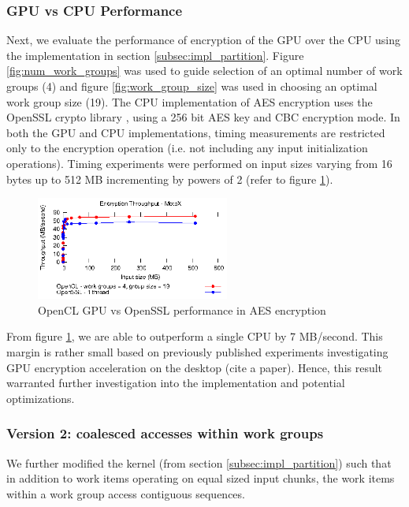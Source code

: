 \documentclass[conference,10pt]{IEEEtran}
\begin{document}
\subsubsection{GPU vs CPU Performance}
\label{subsec:gpu_vs_cpu}

Next, we evaluate the performance of encryption of the GPU over the CPU using the implementation in 
section \ref{subsec:impl_partition}.   Figure \ref{fig:num_work_groups} was used to guide selection 
of an optimal number of work groups (4) and figure \ref{fig:work_group_size} was used in choosing an 
optimal work group size (19).  The CPU implementation of AES encryption uses the OpenSSL crypto 
library \cite{openssl}, using a 256 bit AES key and CBC encryption mode.  In both the GPU and CPU 
implementations, timing measurements are restricted only to the encryption operation (i.e. not 
including any input initialization operations).  Timing experiments were performed on input sizes 
varying from 16 bytes up to 512 MB incrementing by powers of 2 (refer to figure 
\ref{fig:opencl_vs_cpu}).

\begin{figure}[!t]
\centering
\includegraphics[width=2.5in]{../final/motox/4.2/opencl_sizes_vs_cpu_sizes.opencl_4G_19L.cpu_1thread.report.eps}
\caption{OpenCL GPU vs OpenSSL performance in AES encryption}
\label{fig:opencl_vs_cpu}
\end{figure}

From figure \ref{fig:opencl_vs_cpu}, we are able to outperform a single CPU by 7 MB/second. This 
margin is rather small based on previously published experiments investigating GPU encryption 
acceleration on the desktop (cite a paper). Hence, this result warranted further investigation into 
the implementation and potential optimizations.

\subsubsection{Version 2: coalesced accesses within work groups}
\label{subsec:impl_coalesce}

We further modified the kernel (from section \ref{subsec:impl_partition}) such that in addition to 
work items operating on equal sized input chunks, the work items within a work group access 
contiguous sequences.  
\end{document}
